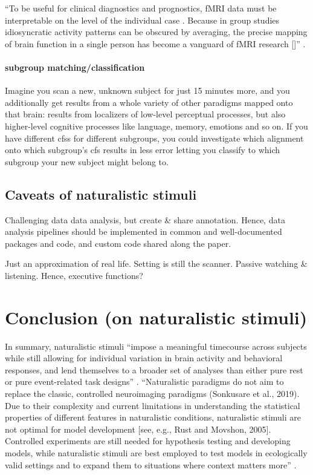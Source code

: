 ``To be useful for clinical diagnostics and prognostics, fMRI data must be
interpretable on the level of the individual case \citep{dubois2016building}.
%
Because in group studies idiosyncratic activity patterns can be obscured by
averaging, the precise mapping of brain function in a single person has become a
vanguard of fMRI research [\citet{laumann2015functional, huth2016natural,
gordon2017precision}]'' \citep{wegrzyn2018thought}.


\paragraph{subgroup matching/classification}
%
Imagine you scan a new, unknown subject for just 15 minutes more, and you
additionally get results from a whole variety of other paradigms mapped onto
that brain: results from localizers of low-level perceptual processes, but also
higher-level cognitive processes like language, memory, emotions and so on.
%
If you have different \acp{cfs} for different subgroups, you could investigate
which alignment onto which subgroup's \ac{cfs} results in less
error letting you classify to which subgroup your new subject might belong to.


\subsection{Caveats of naturalistic stimuli}

%
Challenging data data analysis, but create \& share annotation.
%
Hence, data analysis pipelines should be implemented in common and
well-documented packages and code, and custom code shared along the paper.

%
Just an approximation of real life.
%
Setting is still the scanner.
%
Passive watching \& listening. Hence, executive functions?


\section{Conclusion (on naturalistic stimuli)}
%
In summary, naturalistic stimuli ``impose a meaningful timecourse across
subjects while still allowing for individual variation in brain activity and
behavioral responses, and lend themselves to a broader set of analyses than
either pure rest or pure event-related task designs'' \citep{finn2017can}.
%
``Naturalistic paradigms do not aim to replace the classic, controlled
neuroimaging paradigms (Sonkusare et al., 2019). Due to their complexity and
current limitations in understanding the statistical properties of different
features in naturalistic conditions, naturalistic stimuli are not optimal for
model development [see, e.g., Rust and Movshon, 2005]. Controlled experiments
are still needed for hypothesis testing and developing models, while
naturalistic stimuli are best employed to test models in ecologically valid
settings and to expand them to situations where context matters
more'' \citep{saarimaki2021naturalistic}.
